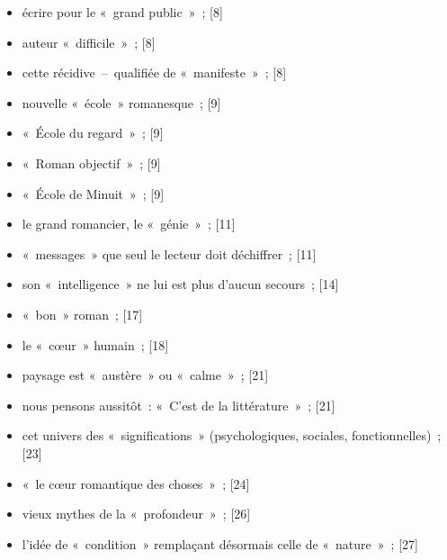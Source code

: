 \documentclass[12pt, a4paper]{article}
\begin{document}
\begin{itemize}

	\item écrire pour le «~grand public~»{\color{gray}~; [8]}

	\item auteur «~difficile~»{\color{gray}~; [8]}

	\item cette récidive~–~qualifiée de «~manifeste~»{\color{gray}~; [8]}

	\item nouvelle «~école~» romanesque{\color{gray}~; [9]}

	\item «~École du regard~»{\color{gray}~; [9]}

	\item «~Roman objectif~»{\color{gray}~; [9]}

	\item «~École de Minuit~»{\color{gray}~; [9]}

	\item le grand romancier, le «~génie~»{\color{gray}~; [11]}

	\item «~messages~» que seul le lecteur doit déchiffrer{\color{gray}~; [11]}

	\item son «~intelligence~» ne lui est plus d’aucun secours{\color{gray}~; [14]}

	\item «~bon~» roman{\color{gray}~; [17]}

	\item le «~cœur~» humain{\color{gray}~; [18]}

	\item paysage est «~austère~» ou «~calme~»{\color{gray}~; [21]}

	\item nous pensons aussitôt~: «~C’est de la littérature~»{\color{gray}~; [21]}

	\item cet univers des «~significations~» (psychologiques, sociales, fonctionnelles){\color{gray}~; [23]}

	\item «~le cœur romantique des choses~»{\color{gray}~; [24]}

	\item vieux mythes de la «~profondeur~»{\color{gray}~; [26]}

	\item  l’idée de «~condition~» remplaçant désormais celle de «~nature~»{\color{gray}~; [27]}


\end{itemize}
\end{document}
